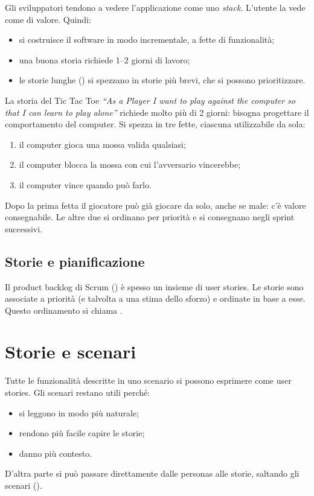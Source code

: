 Gli sviluppatori tendono a vedere l'applicazione come uno \emph{stack}. L'utente la vede come  di valore. Quindi:
\begin{itemize}
  \item si costruisce il software in modo incrementale, a fette di funzionalità;
  \item una buona storia richiede 1--2 giorni di lavoro;
  \item le storie lunghe () si spezzano in storie più brevi, che si possono prioritizzare.
\end{itemize}

\begin{esempio}
La storia del Tic Tac Toe \emph{``As a Player I want to play against the computer so that I can learn to play
alone''} richiede molto più di 2 giorni: bisogna progettare il comportamento del computer. Si spezza in tre fette,
ciascuna utilizzabile da sola:
\begin{enumerate}
  \item il computer gioca una mossa valida qualsiasi;
  \item il computer blocca la mossa con cui l'avversario vincerebbe;
  \item il computer vince quando può farlo.
\end{enumerate}
Dopo la prima fetta il giocatore può già giocare da solo, anche se male: c'è valore consegnabile. Le altre due si
ordinano per priorità e si consegnano negli sprint successivi.
\end{esempio}

\subsection*{Storie e pianificazione}

Il product backlog di Scrum () è spesso un insieme di user stories. Le storie sono associate a
priorità (e talvolta a una stima dello sforzo) e ordinate in base a esse. Questo ordinamento si chiama
.

\section{Storie e scenari}
\label{sec:feature-scenari-storie}

Tutte le funzionalità descritte in uno scenario si possono esprimere come user stories. Gli scenari restano utili perché:
\begin{itemize}
  \item si leggono in modo più naturale;
  \item rendono più facile capire le storie;
  \item danno più contesto.
\end{itemize}
D'altra parte si può passare direttamente dalle personas alle storie, saltando gli scenari ().

